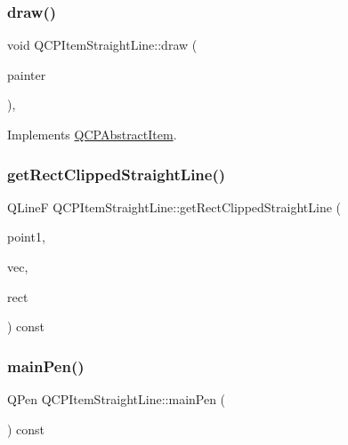 \subsubsection{\texorpdfstring{draw()}{draw()}}
{\footnotesize\ttfamily void Q\+C\+P\+Item\+Straight\+Line\+::draw (\begin{DoxyParamCaption}\item[{\mbox{\hyperlink{class_q_c_p_painter}{Q\+C\+P\+Painter}} $\ast$}]{painter }\end{DoxyParamCaption})\hspace{0.3cm}{\ttfamily [protected]}, {\ttfamily [virtual]}}



Implements \mbox{\hyperlink{class_q_c_p_abstract_item_a007fdab79c935a5da5aa04a21d268c18}{Q\+C\+P\+Abstract\+Item}}.

\mbox{\label{class_q_c_p_item_straight_line_ae1de3d4121c06e5ffea4961722a54f5e}} 
\subsubsection{\texorpdfstring{getRectClippedStraightLine()}{getRectClippedStraightLine()}}
{\footnotesize\ttfamily Q\+LineF Q\+C\+P\+Item\+Straight\+Line\+::get\+Rect\+Clipped\+Straight\+Line (\begin{DoxyParamCaption}\item[{const \mbox{\hyperlink{class_q_c_p_vector2_d}{Q\+C\+P\+Vector2D}} \&}]{point1,  }\item[{const \mbox{\hyperlink{class_q_c_p_vector2_d}{Q\+C\+P\+Vector2D}} \&}]{vec,  }\item[{const Q\+Rect \&}]{rect }\end{DoxyParamCaption}) const\hspace{0.3cm}{\ttfamily [protected]}}

\mbox{\label{class_q_c_p_item_straight_line_a5b1a39cfc54c3e22f65de2958d40eb59}} 
\subsubsection{\texorpdfstring{mainPen()}{mainPen()}}
{\footnotesize\ttfamily Q\+Pen Q\+C\+P\+Item\+Straight\+Line\+::main\+Pen (\begin{DoxyParamCaption}{ }\end{DoxyParamCaption}) const\hspace{0.3cm}{\ttfamily [protected]}}

